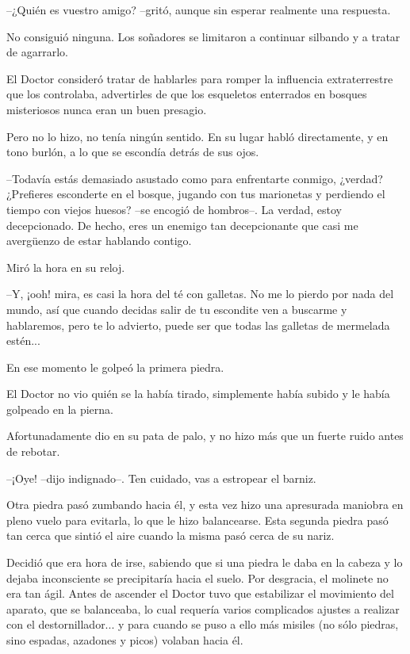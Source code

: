 --¿Quién es vuestro amigo? --gritó, aunque sin esperar realmente una respuesta.

No consiguió ninguna. Los soñadores se limitaron a continuar silbando y a tratar de agarrarlo.

El Doctor consideró tratar de hablarles para romper la influencia extraterrestre que los controlaba, advertirles de que los esqueletos enterrados en bosques misteriosos nunca eran un buen presagio.

Pero no lo hizo, no tenía ningún sentido. En su lugar habló directamente, y en tono burlón, a lo que se escondía detrás de sus ojos.

--Todavía estás demasiado asustado como para enfrentarte conmigo, ¿verdad? ¿Prefieres esconderte en el bosque, jugando con tus marionetas y perdiendo el tiempo con viejos huesos? --se encogió de hombros--. La verdad, estoy decepcionado. De hecho, eres un enemigo tan decepcionante que casi me avergüenzo de estar hablando contigo. 

Miró la hora en su reloj. 

--Y, ¡ooh! mira, es casi la hora del té con galletas. No me lo pierdo por nada del mundo, así que cuando decidas salir de tu escondite ven a buscarme y hablaremos, pero te lo advierto, puede ser que todas las galletas de mermelada estén...

En ese momento le golpeó la primera piedra.

El Doctor no vio quién se la había tirado, simplemente había subido y le había golpeado en la pierna.

Afortunadamente dio en su pata de palo, y no hizo más que un fuerte ruido antes de rebotar.

--¡Oye! --dijo indignado--. Ten cuidado, vas a estropear el barniz.

Otra piedra pasó zumbando hacia él, y esta vez hizo una apresurada maniobra en pleno vuelo para evitarla, lo que le hizo balancearse. Esta segunda piedra pasó tan cerca que sintió el aire cuando la misma pasó cerca de su nariz.

Decidió que era hora de irse, sabiendo que si una piedra le daba en la cabeza y lo dejaba inconsciente se precipitaría hacia el suelo. Por desgracia, el molinete no era tan ágil. Antes de ascender el Doctor tuvo que estabilizar el movimiento del aparato, que se balanceaba, lo cual requería varios complicados ajustes a realizar con el destornillador... y para cuando se puso a ello más misiles (no sólo piedras, sino espadas, azadones y picos) volaban hacia él.

